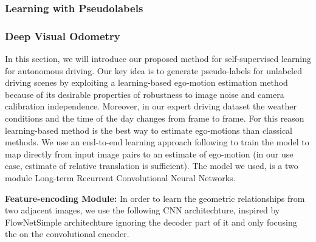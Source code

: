 \documentclass[letterpaper, 12pt]{article}
\theoremstyle{definition}
\theoremstyle{definition}
\theoremstyle{definition}
\theoremstyle{definition}
\theoremstyle{definition}
\begin{document}
\subsubsection{Learning with Pseudolabels}
\label{sec:org997de47}
\subsubsection{Deep Visual Odometry}
\label{sec:orgc40839c}
In this section, we will introduce our proposed method for self-supervised
learning for autonomous driving. Our key idea is to generate pseudo-labels for
unlabeled driving scenes by exploiting a learning-based ego-motion estimation
method because of its desirable properties of robustness to image noise and
camera calibration independence. Moreover, in our expert driving dataset the
weather conditions and the time of the day changes from frame to frame. For this
reason learning-based method is the best way to estimate ego-motions than
classical methods. We use an end-to-end learning approach following
\cite{Wang2017, Zhai2019} to train the model to map directly from input image
pairs to an estimate of ego-motion (in our use case, estimate of relative
translation is sufficient). The model we used, is a two module Long-term
Recurrent Convolutional Neural Networks.

\textbf{Feature-encoding Module:} In order to learn the geometric relationships from
two adjacent images, we use the following CNN architechture, inspired by
FlowNetSimple architechture \cite{Fischer2015} ignoring the decoder part of it
and only focusing the on the convolutional encoder.


\end{document}
